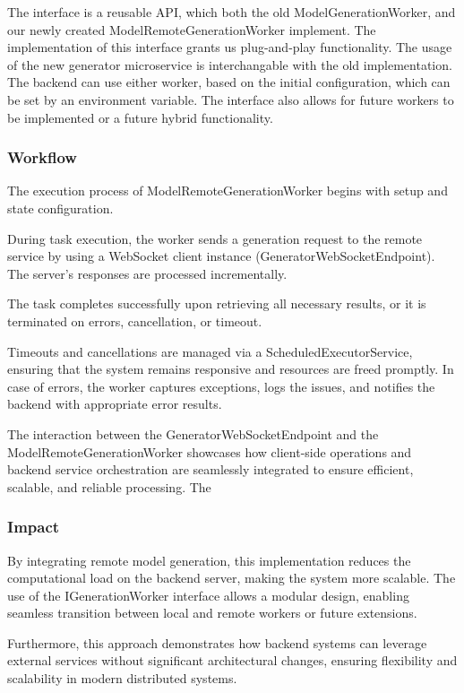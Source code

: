 				The interface is a reusable API, which both the old ModelGenerationWorker, and our newly created ModelRemoteGenerationWorker implement.
				The implementation of this interface grants us plug-and-play functionality. The usage of the new generator microservice is interchangable
				with the old implementation. The backend can use either worker, based on the initial configuration, which can be set by an environment
				variable.
				The interface also allows for future workers to be implemented or a future hybrid functionality.

			\subsubsection{Workflow}
				The execution process of ModelRemoteGenerationWorker begins with setup and state configuration. 

				During task execution, the worker sends a generation request to the remote service by using a WebSocket client instance (GeneratorWebSocketEndpoint). 
				The server's responses are processed incrementally.

				The task completes successfully upon retrieving all necessary results, or it is terminated on errors, cancellation, or timeout.

				Timeouts and cancellations are managed via a ScheduledExecutorService, ensuring that the system remains responsive and resources are freed promptly. In case of errors, the worker captures exceptions, logs the issues, and notifies the backend with appropriate error results.

				The interaction between the GeneratorWebSocketEndpoint and the ModelRemoteGenerationWorker 
				showcases how client-side operations and backend service orchestration are seamlessly integrated to ensure efficient, scalable, and reliable processing.
				The 

			\subsubsection{Impact}
				By integrating remote model generation, this implementation reduces the computational load on the backend server, 
				making the system more scalable. The use of the IGenerationWorker interface allows a modular design, enabling seamless 
				transition between local and remote workers or future extensions. 
				
				Furthermore, this approach demonstrates how backend systems can leverage external services without significant architectural changes, 
				ensuring flexibility and scalability in modern distributed systems.

